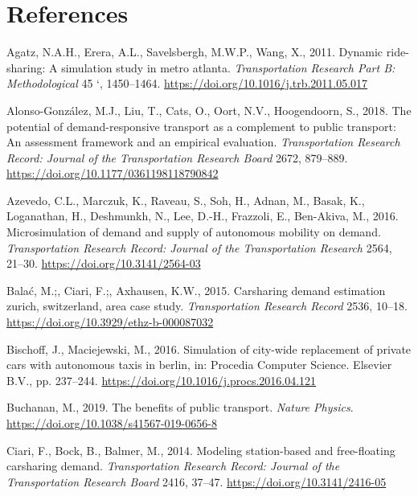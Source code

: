 \documentclass[
]{report}
\newlength{\cslhangindent}
\newlength{\cslentryspacingunit} %
\newenvironment{CSLReferences}[2] %
 {%
  \setlength{\parindent}{0pt}
  \ifodd #1
  \let\oldpar\par
  \def\par{\hangindent=\cslhangindent\oldpar}
  \fi
  \setlength{\parskip}{#2\cslentryspacingunit}
 }%
 {}
\begin{document}
\hypertarget{references}{%
\chapter*{References}\label{references}}

\hypertarget{refs}{}
\begin{CSLReferences}{1}{0}
\leavevmode{}%
Agatz, N.A.H., Erera, A.L., Savelsbergh, M.W.P., Wang, X., 2011. Dynamic ride-sharing: A simulation study in metro atlanta. \emph{Transportation Research Part B: Methodological} 45 `, 1450--1464. \url{https://doi.org/10.1016/j.trb.2011.05.017}

\leavevmode{}%
Alonso-González, M.J., Liu, T., Cats, O., Oort, N.V., Hoogendoorn, S., 2018. The potential of demand-responsive transport as a complement to public transport: An assessment framework and an empirical evaluation. \emph{Transportation Research Record: Journal of the Transportation Research Board} 2672, 879--889. \url{https://doi.org/10.1177/0361198118790842}

\leavevmode{}%
Azevedo, C.L., Marczuk, K., Raveau, S., Soh, H., Adnan, M., Basak, K., Loganathan, H., Deshmunkh, N., Lee, D.-H., Frazzoli, E., Ben-Akiva, M., 2016. Microsimulation of demand and supply of autonomous mobility on demand. \emph{Transportation Research Record: Journal of the Transportation Research} 2564, 21--30. \url{https://doi.org/10.3141/2564-03}

\leavevmode{}%
Balać, M.;, Ciari, F.;, Axhausen, K.W., 2015. Carsharing demand estimation zurich, switzerland, area case study. \emph{Transportation Research Record} 2536, 10--18. \url{https://doi.org/10.3929/ethz-b-000087032}

\leavevmode{}%
Bischoff, J., Maciejewski, M., 2016. Simulation of city-wide replacement of private cars with autonomous taxis in berlin, in: Procedia Computer Science. Elsevier B.V., pp. 237--244. \url{https://doi.org/10.1016/j.procs.2016.04.121}

\leavevmode{}%
Buchanan, M., 2019. The benefits of public transport. \emph{Nature Physics}. \url{https://doi.org/10.1038/s41567-019-0656-8}

\leavevmode{}%
Ciari, F., Bock, B., Balmer, M., 2014. Modeling station-based and free-floating carsharing demand. \emph{Transportation Research Record: Journal of the Transportation Research Board} 2416, 37--47. \url{https://doi.org/10.3141/2416-05}


\end{CSLReferences}
\end{document}

